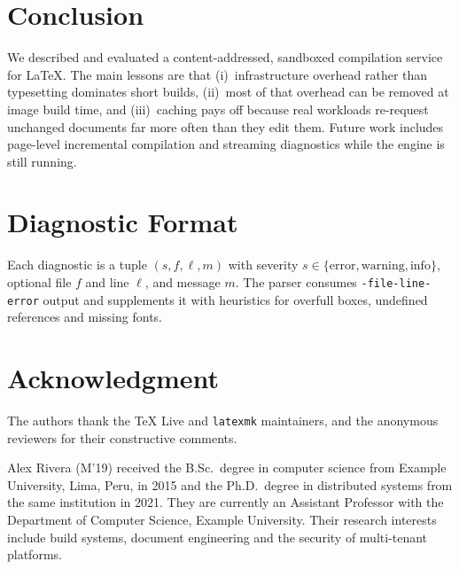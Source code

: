 \documentclass[journal]{IEEEtran}
\begin{document}
\section{Conclusion}
\label{sec:conclusion}
We described and evaluated a content-addressed, sandboxed compilation
service for \LaTeX{}. The main lessons are that (i)~infrastructure overhead
rather than typesetting dominates short builds, (ii)~most of that overhead
can be removed at image build time, and (iii)~caching pays off because real
workloads re-request unchanged documents far more often than they edit them.
Future work includes page-level incremental compilation and streaming
diagnostics while the engine is still running.

\appendices
\section{Diagnostic Format}
Each diagnostic is a tuple $(s, f, \ell, m)$ with severity
$s \in \{\text{error}, \text{warning}, \text{info}\}$, optional file $f$ and
line $\ell$, and message $m$. The parser consumes \texttt{-file-line-error}
output and supplements it with heuristics for overfull boxes, undefined
references and missing fonts.

\section*{Acknowledgment}
The authors thank the \TeX{} Live and \texttt{latexmk} maintainers, and the
anonymous reviewers for their constructive comments.




{Alex Rivera}
(M'19) received the B.Sc.\ degree in computer science from Example
University, Lima, Peru, in 2015 and the Ph.D.\ degree in distributed systems
from the same institution in 2021. They are currently an Assistant Professor
with the Department of Computer Science, Example University. Their research
interests include build systems, document engineering and the security of
multi-tenant platforms.
\end{IEEEbiography}
\end{document}
